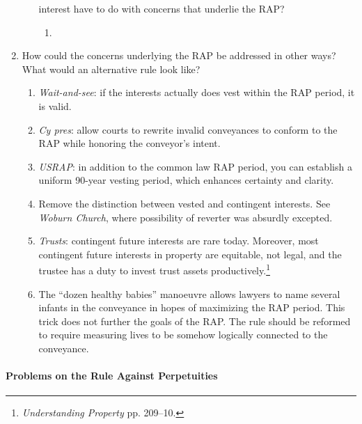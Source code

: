 \begin{enumerate}
\begin{enumerate}
        interest have to do with concerns that underlie the RAP?
        \begin{enumerate}
            \item %
        \end{enumerate}
    \end{enumerate}
    \item How could the concerns underlying the RAP be addressed in other 
    ways? What would an alternative rule look like?
    \begin{enumerate}
        \item \emph{Wait-and-see}: if the interests actually does vest within 
        the RAP period, it is valid.
        \item \emph{Cy pres}: allow courts to rewrite invalid conveyances to 
        conform to the RAP while honoring the conveyor's intent.
        \item \emph{USRAP}: in addition to the common law RAP period, you can 
        establish a uniform 90-year vesting period, which enhances certainty 
        and clarity.
        \item Remove the distinction between vested and contingent interests. 
        See \emph{Woburn Church}, where possibility of reverter was absurdly 
        excepted.
        \item \emph{Trusts}: contingent future interests are rare today. 
        Moreover, most contingent future interests in property are equitable, 
        not legal, and the trustee has a duty to invest trust assets 
        productively.\footnote{\emph{Understanding Property} pp. 209--10.}
        \item The ``dozen healthy babies'' manoeuvre allows lawyers to name 
        several infants in the conveyance in hopes of maximizing the RAP 
        period. This trick does not further the goals of the RAP. The rule 
        should be reformed to require measuring lives to be somehow logically 
        connected to the conveyance.
    \end{enumerate}
\end{enumerate}

\paragraph{Problems on the Rule Against Perpetuities}


